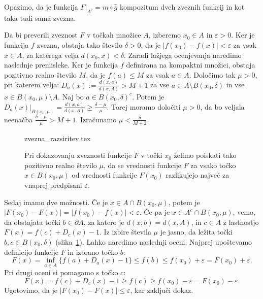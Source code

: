 \documentclass[mat1]{fmfdelo}
\newcommand{\0}{0}
\begin{document}
\begin{dokaz}
Opazimo, da je funkcija  $F|_{A^c} = m \circ \hat{g}$ kompozitum dveh zveznih funkcij in kot taka tudi sama zvezna.

Da bi preverili zveznost $F$ v točkah množice $A$, izberemo $x_0 \in A$ in $\varepsilon > 0$. Ker je funkcija $f$ zvezna, obstaja tako število $\delta > 0$, da je $|f(x_0) - f(x)| < \varepsilon$ za vsak $x \in A$, za katerega velja $d(x_0, x) < \delta$. Zaradi lažjega ocenjevanja naredimo naslednje premisleke. Ker je funkcija $f$ definirana na kompaktni množici, obstaja pozitivno realno število $M$, da je $f(a) \leq M$ za vsak $a \in A$. Določimo tak $\mu >0$, pri katerem velja: $D_a(x) := \frac{d(x, a)}{d(x, A)} > M + 1$ za vse $a \in A \setminus B(x_0, \delta)$ in vse $x \in B(x_0, \mu)\setminus A$. Naj bo $a \in B(x_0, \delta)^c$. Potem je
$D_a(x)|_{B(x_0, \mu)}= \frac{d(x, a)}{d(x, A)} \geq \frac{\delta - \mu}{\mu}$. Torej moramo določiti $\mu > 0$, da bo veljala neenačba $\frac{\delta - \mu}{\mu} > M + 1$. Izračunamo $\mu <\frac{\delta}{M + 2}$.
\begin{figure}[h!]
	\centering
{zvezna_razsiritev.tex}
	\caption{Pri dokazovanju zveznosti funkcije $F$ v točki $x_0$ želimo poiskati tako pozitivno realno število $\mu$, da se vrednosti funkcije $F$ za vsako točko $x \in B(x_0, \mu)$ od vrednosti funkcije $F(x_0)$ razlikujejo največ za vnaprej predpisani $\varepsilon$.}\label{fig:zveznarazsiritev}
\end{figure}
Sedaj imamo dve možnosti. Če je $x \in A \cap B(x_0, \mu)$, potem je 
$|F(x_0) - F(x)|=|f(x_0) - f(x)| < \varepsilon$. Če pa je $x \in A^c \cap B(x_0, \mu)$, vemo, da obstajata točki $b \in \partial A$, za katero je $d(x, b) = d(x, A)$, in $c \in A $ z lastnostjo $F(x) = f(c) + D_c(x) -1$. Iz izbire števila $\mu$ je jasno, da ležita točki $b, c \in B(x_0, \delta)$ (slika~\ref{fig:zveznarazsiritev}). Lahko naredimo naslednji oceni. Najprej upoštevamo definicijo funkcije $F$ in izbrano točko $b$:
\begin{equation*}
F(x) = \inf_{a \in A} \{ f(a) + D_a(x) - 1\} \leq f(b) \leq f(x_0) +\varepsilon = F(x_0) +\varepsilon.
\end{equation*}
Pri drugi oceni si pomagamo s točko $c$:
\begin{equation*}
F(x) = f(c) + D_c(x) -1 \geq f(c) \geq f(x_0) - \varepsilon =  F(x_0) -\varepsilon.
\end{equation*}
Ugotovimo, da je $| F(x_0) - F(x) | \leq \varepsilon$, kar zaključi dokaz.
\end{dokaz}
\end{document}
